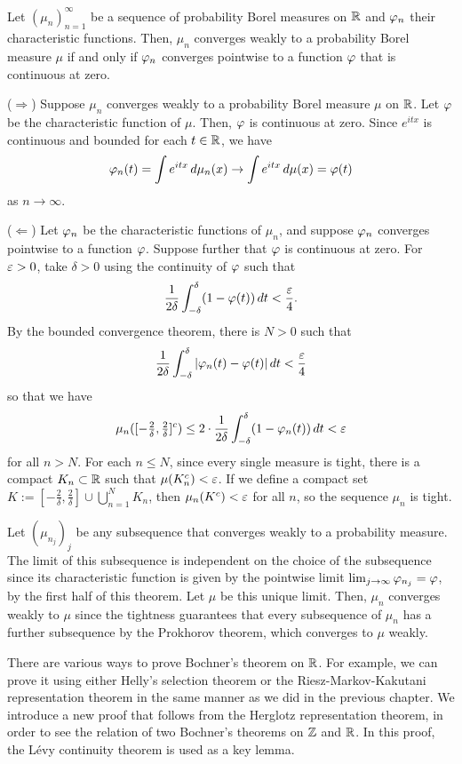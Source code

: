 \documentclass[a4paper]{article}
\begin{document}
\begin{thm}
Let $(\mu_n)_{n=1}^\infty$ be a sequence of probability Borel measures on $\mathbb{R}$ and $\varphi_n$ their characteristic functions.
Then, $\mu_n$ converges weakly to a probability Borel measure $\mu$ if and only if $\varphi_n$ converges pointwise to a function $\varphi$ that is continuous at zero.
\end{thm}
\begin{pf}
($\Rightarrow$)
Suppose $\mu_n$ converges weakly to a probability Borel measure $\mu$ on $\mathbb{R}$.
Let $\varphi$ be the characteristic function of $\mu$.
Then, $\varphi$ is continuous at zero.
Since $e^{itx}$ is continuous and bounded for each $t\in\mathbb{R}$, we have
\[\varphi_n(t)=\int e^{itx}\,d\mu_n(x)\to\int e^{itx}\,d\mu(x)=\varphi(t)\]
as $n\to\infty$.

($\Leftarrow$)
Let $\varphi_n$ be the characteristic functions of $\mu_n$, and suppose $\varphi_n$ converges pointwise to a function $\varphi$.
Suppose further that $\varphi$ is continuous at zero.
For $\varepsilon>0$, take $\delta>0$ using the continuity of $\varphi$ such that
\[\frac1{2\delta}\int_{-\delta}^\delta(1-\varphi(t))\,dt<\frac{\varepsilon}4.\]
By the bounded convergence theorem, there is $N>0$ such that
\[\frac1{2\delta}\int_{-\delta}^\delta|\varphi_n(t)-\varphi(t)|\,dt<\frac{\varepsilon}4\]
so that we have
\[\mu_n([-\tfrac2\delta,\tfrac2\delta]^c)\le2\cdot\frac1{2\delta}\int_{-\delta}^\delta(1-\varphi_n(t))\,dt<\varepsilon\]
for all $n>N$.
For each $n\le N$, since every single measure is tight, there is a compact $K_n\subset\mathbb{R}$ such that $\mu(K_n^c)<\varepsilon$.
If we define a compact set $K:=[-\frac2\delta,\frac2\delta]\cup\bigcup_{n=1}^NK_n$, then $\mu_n(K^c)<\varepsilon$ for all $n$, so the sequence $\mu_n$ is tight.

Let $(\mu_{n_j})_j$ be any subsequence that converges weakly to a probability measure.
The limit of this subsequence is independent on the choice of the subsequence since its characteristic function is given by the pointwise limit $\lim_{j\to\infty}\varphi_{n_j}=\varphi$, by the first half of this theorem.
Let $\mu$ be this unique limit.
Then, $\mu_n$ converges weakly to $\mu$ since the tightness guarantees that every subsequence of $\mu_n$ has a further subsequence by the Prokhorov theorem, which converges to $\mu$ weakly.
\end{pf}


There are various ways to prove Bochner's theorem on $\mathbb{R}$.
For example, we can prove it using either Helly's selection theorem or the Riesz-Markov-Kakutani representation theorem in the same manner as we did in the previous chapter.
We introduce a new proof that follows from the Herglotz representation theorem, in order to see the relation of two Bochner's theorems on $\mathbb{Z}$ and $\mathbb{R}$.
In this proof, the L\'evy continuity theorem is used as a key lemma.
\end{document}
